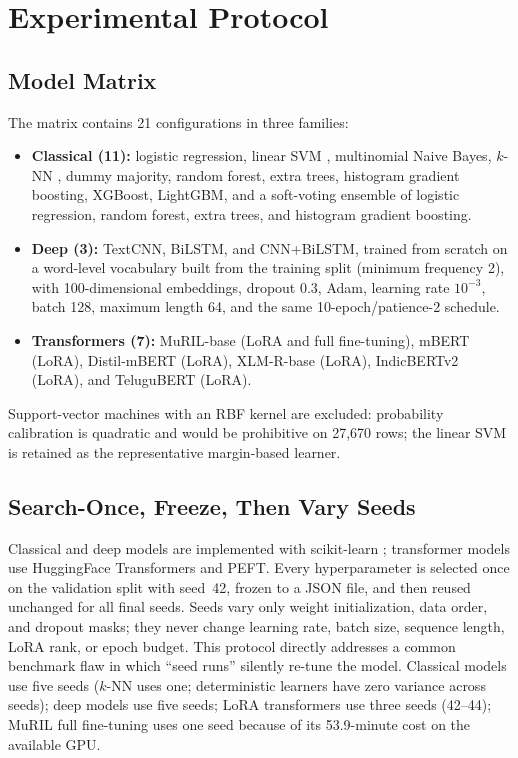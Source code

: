 \documentclass[10pt,journal]{IEEEtran}
\begin{document}
\section{Experimental Protocol}
\subsection{Model Matrix}
The matrix contains 21 configurations in three families:
\begin{itemize}
\item \textbf{Classical (11):} logistic regression, linear SVM \cite{cortes1995}, multinomial Naive Bayes, $k$-NN \cite{cover1967}, dummy majority, random forest, extra trees, histogram gradient boosting, XGBoost, LightGBM, and a soft-voting ensemble of logistic regression, random forest, extra trees, and histogram gradient boosting.
\item \textbf{Deep (3):} TextCNN, BiLSTM, and CNN+BiLSTM, trained from scratch on a word-level vocabulary built from the training split (minimum frequency 2), with 100-dimensional embeddings, dropout 0.3, Adam, learning rate $10^{-3}$, batch 128, maximum length 64, and the same 10-epoch/patience-2 schedule.
\item \textbf{Transformers (7):} MuRIL-base (LoRA and full fine-tuning), mBERT (LoRA), Distil-mBERT (LoRA), XLM-R-base (LoRA), IndicBERTv2 (LoRA), and TeluguBERT (LoRA).
\end{itemize}

Support-vector machines with an RBF kernel are excluded: probability calibration is quadratic and would be prohibitive on 27{,}670 rows; the linear SVM is retained as the representative margin-based learner.

\subsection{Search-Once, Freeze, Then Vary Seeds}
Classical and deep models are implemented with scikit-learn \cite{pedregosa2011}; transformer models use HuggingFace Transformers \cite{wolf2020} and PEFT. Every hyperparameter is selected once on the validation split with seed~42, frozen to a JSON file, and then reused unchanged for all final seeds. Seeds vary only weight initialization, data order, and dropout masks; they never change learning rate, batch size, sequence length, LoRA rank, or epoch budget. This protocol directly addresses a common benchmark flaw in which ``seed runs'' silently re-tune the model. Classical models use five seeds ($k$-NN uses one; deterministic learners have zero variance across seeds); deep models use five seeds; LoRA transformers use three seeds (42--44); MuRIL full fine-tuning uses one seed because of its 53.9-minute cost on the available GPU.
\end{document}
